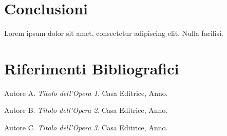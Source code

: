 \documentclass[12pt, a4paper, twoside]{article}
\begin{document}


\section{Conclusioni}
Lorem ipsum dolor sit amet, consectetur adipiscing elit. Nulla facilisi. 

\newpage

\section*{Riferimenti Bibliografici}

\begin{thebibliography}{9}

Autore A. \textit{Titolo dell'Opera 1}. Casa Editrice, Anno.

Autore B. \textit{Titolo dell'Opera 2}. Casa Editrice, Anno.

Autore C. \textit{Titolo dell'Opera 3}. Casa Editrice, Anno.

\end{thebibliography}

\newpage

\tableofcontents
\end{document}
